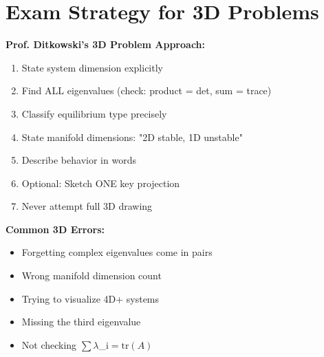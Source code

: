 \documentclass[12pt]{article}
\begin{document}
\section{Exam Strategy for 3D Problems}

\begin{examtip}
\textbf{Prof. Ditkowski's 3D Problem Approach:}
\begin{enumerate}
    \item State system dimension explicitly
    \item Find ALL eigenvalues (check: product = det, sum = trace)
    \item Classify equilibrium type precisely
    \item State manifold dimensions: "2D stable, 1D unstable"
    \item Describe behavior in words
    \item Optional: Sketch ONE key projection
    \item Never attempt full 3D drawing
\end{enumerate}
\end{examtip}

\begin{warning}
\textbf{Common 3D Errors:}
\begin{itemize}
    \item Forgetting complex eigenvalues come in pairs
    \item Wrong manifold dimension count
    \item Trying to visualize 4D+ systems
    \item Missing the third eigenvalue
    \item Not checking $\sum \lambda$_{i}$ = \text{tr}(A)$
\end{itemize}
\end{warning}
\end{document}
